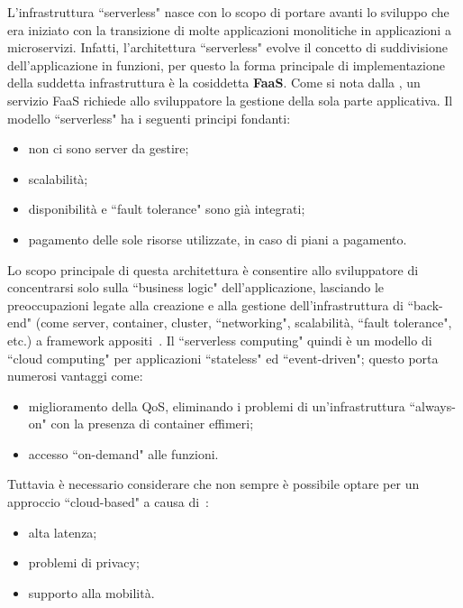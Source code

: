 \documentclass[12pt,a4paper,openany,twoside]{book}
\begin{document}
L'infrastruttura ``serverless" nasce con lo scopo di portare avanti lo sviluppo che era iniziato con la transizione di molte applicazioni monolitiche in applicazioni a microservizi. Infatti, l'architettura ``serverless" evolve il concetto di suddivisione dell'applicazione in funzioni, per questo la forma principale di implementazione della suddetta infrastruttura è la cosiddetta \textbf{\ac{FaaS}}. Come si nota dalla , un servizio \ac{FaaS} richiede allo sviluppatore la gestione della sola parte applicativa. Il modello ``serverless" ha i seguenti principi fondanti:
\begin{itemize}
    \item non ci sono server da gestire;
    
    \item scalabilità;
    
    \item disponibilità e ``fault tolerance" sono già integrati;
    
    \item pagamento delle sole risorse utilizzate, in caso di piani a pagamento.
\end{itemize}
Lo scopo principale di questa architettura è consentire allo sviluppatore di concentrarsi solo sulla ``business logic" dell'applicazione, lasciando le preoccupazioni legate alla creazione e alla gestione dell'infrastruttura di ``back-end" (come server, container, cluster, ``networking", scalabilità, ``fault tolerance", etc.) a framework appositi~\cite{Mohanty2018}.
Il ``serverless computing" quindi è un modello di ``cloud computing" per applicazioni ``stateless" ed ``event-driven"; questo porta numerosi vantaggi come:
\begin{itemize}
    \item miglioramento della \ac{QoS}, eliminando i problemi di un'infrastruttura ``always-on" con la presenza di container effimeri;
    
    \item accesso ``on-demand" alle funzioni.
\end{itemize}
Tuttavia è necessario considerare che non sempre è possibile optare per un approccio ``cloud-based" a causa di~\cite{Palade2019}:
\begin{itemize}
    \item alta latenza;
    
    \item problemi di privacy;
    
    \item supporto alla mobilità.
\end{itemize}
\end{document}
